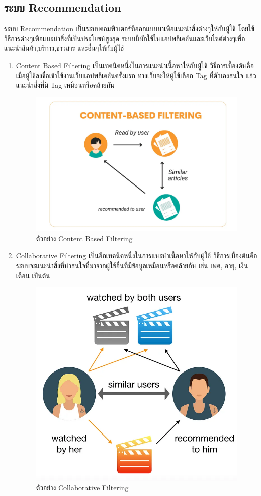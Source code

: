 \subsection{ระบบ Recommendation}
ระบบ Recommendation เป็นระบบคอมพิวเตอร์ที่ออกแบบมาเพื่อแนะนำสิ่งต่างๆให้กับผู้ใช้ โดยใช้วิธีการต่างๆเพื่อแนะนำสิ่งที่เป็นประโยชน์สูงสุด ระบบนี้มักใช้ในแอปพลิเคชันและเว็บไซต์ต่างๆเพื่อแนะนำสินค้า,บริการ,ข่าวสาร และอื่นๆให้กับผู้ใช้
\cite{recom}
\begin{enumerate}
    \item Content Based Filtering เป็นเทคนิคหนึ่งในการแนะนำเนื้อหาให้กับผู้ใช้ วิธีการเบื้องต้นคือ เมื่อผู้ใช้ลงชื่อเข้าใช้งานเว็บแอปพลิเคชันครั้งแรก ทางเว็บจะให้ผู้ใช้เลือก Tag ที่ตัวเองสนใจ แล้วแนะนำสิ่งที่มี Tag เหมือนหรือคล้ายกัน 
    \begin{figure}[h] %
        \begin{center}
        \includegraphics[width=0.6\linewidth]{image/content_base.png}
        \end{center}
        \caption[ตัวอย่าง Content Based Filtering]{ตัวอย่าง Content Based Filtering\cite{content_based}}
        \label{fig:content_based}
        \end{figure}
    \item Collaborative Filtering เป็นอีกเทคนิคหนึ่งในการแนะนำเนื้อหาให้กับผู้ใช้ วิธีการเบื้องต้นคือ ระบบจะแนะนำสิ่งที่น่าสนใจที่มาจากผู้ใช้อื่นที่มีข้อมูลเหมือนหรือคล้ายกัน เช่น เพศ, อายุ, เงินเดือน เป็นต้น 
    \begin{figure}[h] %
        \begin{center}
        \includegraphics[width=0.6\linewidth]{image/collaborative.png}
        \end{center}
        \caption[ตัวอย่าง Collaborative Filtering]{ตัวอย่าง Collaborative Filtering\cite{collaborative}}
        \label{fig:collaborative_filtering}
        \end{figure}
\end{enumerate}
